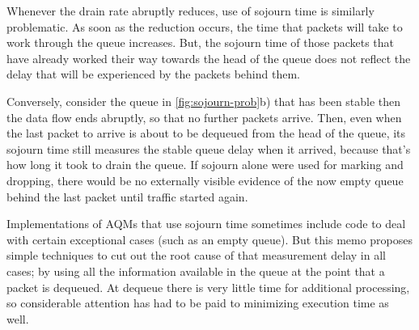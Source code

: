 Whenever the drain rate abruptly reduces, use of sojourn time is similarly problematic. As soon as the reduction occurs, the time that packets will take to work through the queue increases. But, the sojourn time of those packets that have already worked their way towards the head of the queue does not reflect the delay that will be experienced by the packets behind them.

Conversely, consider the queue in \autoref{fig:sojourn-prob}b) that has been stable then the data flow ends abruptly, so that no further packets arrive. Then, even when the last packet to arrive is about to be dequeued from the head of the queue, its sojourn time still measures the stable queue delay when it arrived, because that's how long it took to drain the queue. If sojourn alone were used for marking and dropping, there would be no externally visible evidence of the now empty queue behind the last packet until traffic started again.

Implementations of AQMs that use sojourn time sometimes include code to deal with certain exceptional cases (such as an empty queue). But this memo proposes simple techniques to cut out the root cause of that measurement delay in all cases; by using all the information available in the queue at the point that a packet is dequeued. At dequeue there is very little time for additional processing, so considerable attention has had to be paid to minimizing execution time as well.
